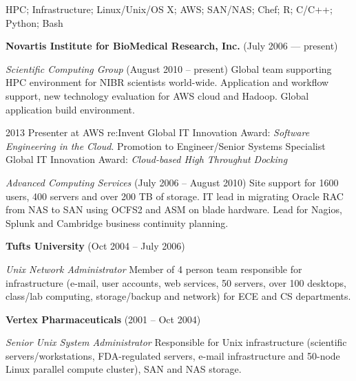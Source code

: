 \documentclass[11pt,article,oneside]{memoir}
\begin{document}
\medskip

\reversemarginpar

\bigskip


\ind HPC; Infrastructure; Linux/Unix/OS X; AWS; SAN/NAS; Chef; R; C/C++; Python; Bash

\bigskip

{}

\ind \textbf{Novartis Institute for BioMedical Research, Inc.} (July 2006 --- present)

\noindent\textit{Scientific Computing Group} (August 2010 -- present)
Global team supporting HPC environment for NIBR scientists
world-wide. Application and workflow support, new technology
evaluation for AWS cloud and Hadoop. Global application build
environment.

\ind \hspace{0.35in} \footnotesize 2013 Presenter at AWS
re:Invent Global IT Innovation Award:
\textit{Software Engineering in the Cloud}. Promotion to
Engineer/Senior Systems Specialist Global IT
Innovation Award: \textit{Cloud-based High Throughut Docking}
\normalsize \vspace{0.05in}

\noindent\textit{Advanced Computing Services} (July 2006 -- August
2010) Site support for 1600 users, 400 servers and over 200 TB of
storage. IT lead in migrating Oracle RAC from NAS to SAN using OCFS2
and ASM on blade hardware. Lead for Nagios, Splunk and Cambridge
business continuity planning.

\ind\textbf{Tufts University} (Oct 2004 -- July 2006)

\noindent\textit{Unix Network Administrator} Member of 4 person team
responsible for infrastructure (e-mail, user accounts, web services,
50 servers, over 100 desktops, class/lab computing, storage/backup and
network) for ECE and CS departments.

\ind \textbf{Vertex Pharmaceuticals} (2001 -- Oct 2004)

\noindent\textit{Senior Unix System Administrator} Responsible for
Unix infrastructure (scientific servers/workstations, FDA-regulated
servers, e-mail infrastructure and 50-node Linux parallel compute
cluster), SAN and NAS storage.
\end{document}
